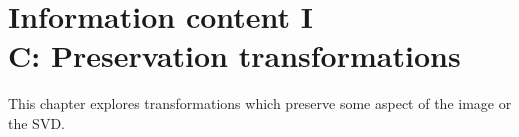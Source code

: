 \chapter[Information content I\\C: Energy preservation]{Information content I\\C: Preservation transformations}

This chapter explores transformations which preserve some aspect of the image or the SVD.

%

\clearpage


\endinput